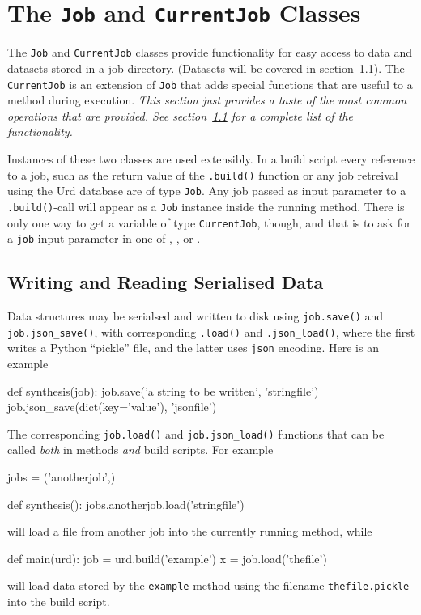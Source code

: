 \section{The \texttt{Job} and \texttt{CurrentJob} Classes}
The \texttt{Job} and \texttt{CurrentJob} classes provide functionality
for easy access to data and datasets stored in a job directory.
(Datasets will be covered in section~\ref{}).  The \texttt{CurrentJob}
is an extension of \texttt{Job} that adds special functions that are
useful to a method during execution.  \textsl{This section just
  provides a taste of the most common operations that are provided.
  See section~\ref{} for a complete list of the functionality.}

Instances of these two classes are used extensibly.  In a build script
every reference to a job, such as the return value of the
\texttt{.build()} function or any job retreival using the Urd database
are of type \texttt{Job}.  Any job passed as input parameter to a
\texttt{.build()}-call will appear as a \texttt{Job} instance inside
the running method.  There is only one way to get a variable of type
\texttt{CurrentJob}, though, and that is to ask for a \texttt{job}
input parameter in one of \prepare, \analysis, or \synthesis.


\subsection{Writing and Reading Serialised Data}
Data structures may be serialsed and written to disk using
\texttt{job.save()} and \texttt{job.json\_save()}, with corresponding
\texttt{.load()} and \texttt{.json\_load()}, where the first writes a
Python ``pickle'' file, and the latter uses \texttt{json} encoding.
Here is an example
\begin{python}
def synthesis(job):
   job.save('a string to be written', 'stringfile')
   job.json_save(dict(key='value'), 'jsonfile')
\end{python}
The corresponding \texttt{job.load()} and \texttt{job.json\_load()}
functions that can be called \textsl{both} in methods \textsl{and}
build scripts.  For example
\begin{python}
jobs = ('anotherjob',)

def synthesis():
    jobs.anotherjob.load('stringfile')
\end{python}
will load a file from another job into the currently running method, while
\begin{python}
def main(urd):
    job = urd.build('example')
    x = job.load('thefile')
\end{python}
will load data stored by the \texttt{example} method using the
filename \texttt{thefile.pickle} into the build script.


